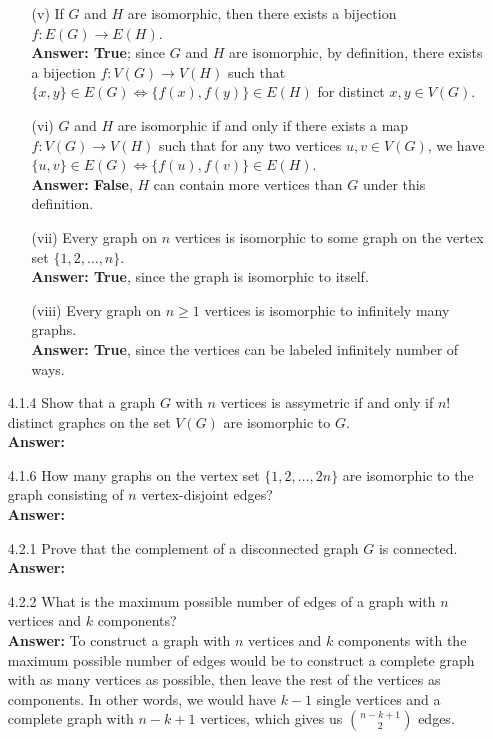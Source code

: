 \documentclass{article}
\begin{document}
\begin{itemize}
\begin{itemize}
              \item [(v)] If $G$ and $H$ are isomorphic, then there exists a bijection $f:E(G)\rightarrow E(H)$.\\\textbf{Answer: True}; since $G$ and $H$ are isomorphic, by definition, there exists a bijection $f:V(G)\rightarrow V(H)$ such that $\{x,y\}\in E(G)\Leftrightarrow\{f(x),f(y)\}\in E(H)$ for distinct $x,y\in V(G)$.
              \item [(vi)] $G$ and $H$ are isomorphic if and only if there exists a map $f:V(G)\rightarrow V(H)$ such that for any two vertices $u,v\in V(G)$, we have $\{u,v\}\in E(G)\Leftrightarrow\{f(u),f(v)\}\in E(H)$.\\\textbf{Answer: False}, $H$ can contain more vertices than $G$ under this definition.
              \item [(vii)] Every graph on $n$ vertices is isomorphic to some graph on the vertex set $\{1,2,\ldots,n\}$.\\\textbf{Answer: True}, since the graph is isomorphic to itself.
              \item [(viii)] Every graph on $n\geq 1$ vertices is isomorphic to infinitely many graphs.\\\textbf{Answer: True}, since the vertices can be labeled infinitely number of ways.
          \end{itemize}
    \item [4.1.4] Show that a graph $G$ with $n$ vertices is assymetric if and only if $n!$ distinct graphcs on the set $V(G)$ are isomorphic to $G$.\\\textbf{Answer: }
    \item [4.1.6] How many graphs on the vertex set $\{1,2,\ldots,2n\}$ are isomorphic to the graph consisting of $n$ vertex-disjoint edges?\\\textbf{Answer: }
    \item [4.2.1] Prove that the complement of a disconnected graph $G$ is connected.\\\textbf{Answer: }
    \item [4.2.2] What is the maximum possible number of edges of a graph with $n$ vertices and $k$ components?\\\textbf{Answer: } To construct a graph with $n$ vertices and $k$ components with the maximum possible number of edges would be to construct a complete graph with as many vertices as possible, then leave the rest of the vertices as components. In other words, we would have $k-1$ single vertices and a complete graph with $n-k+1$ vertices, which gives us $n-k+1\choose 2$ edges.

\end{itemize}
\end{document}
